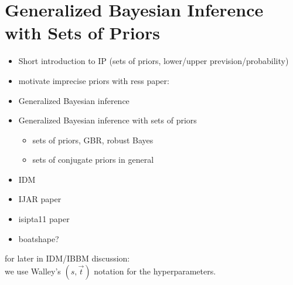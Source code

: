 \chapter{Generalized Bayesian Inference with Sets of Priors}

\begin{itemize}
\item Short introduction to IP (sets of priors, lower/upper prevision/probability)
\item motivate imprecise priors with ress paper: \cite{Walter2013a}
\item Generalized Bayesian inference
\item Generalized Bayesian inference with sets of priors
 \begin{itemize}
 \item sets of priors, GBR, robust Bayes
 \item sets of conjugate priors in general
 \end{itemize}
\item IDM
\item IJAR paper \cite{Walter2009a}
\item isipta11 paper \cite{Walter2011a}
\item boatshape?
\end{itemize}


for later in IDM/IBBM discussion:\\
we use Walley's \cite[\S 7.7.3, p.~395]{1991:walley} $(s,\vec{t})$ notation for the hyperparameters.
